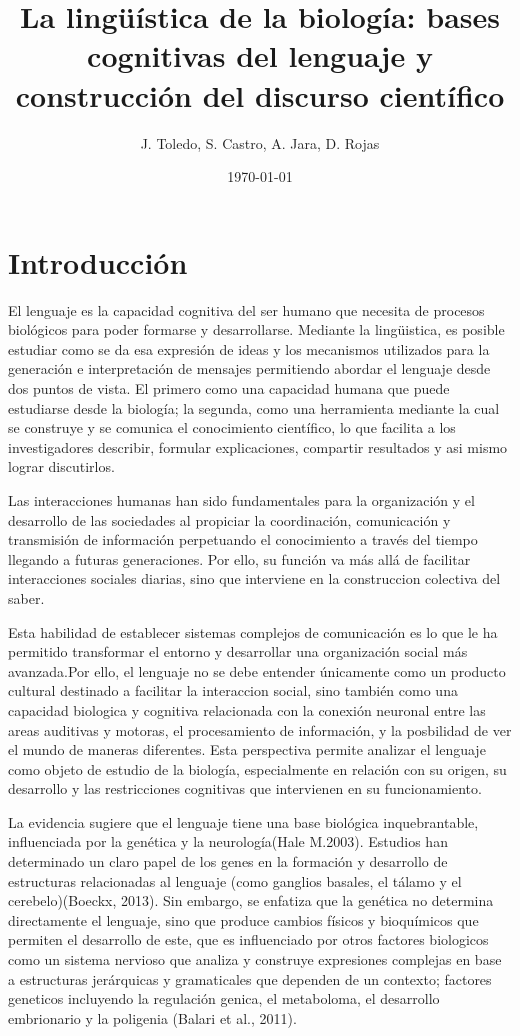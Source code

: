 \documentclass[12pt]{article}
\title{La lingüística de la biología: bases cognitivas del lenguaje y construcción del discurso científico}
\author{J. Toledo, S. Castro, A. Jara, D. Rojas}
\date{\today}
\begin{document}
\maketitle

\section{Introducción}
El lenguaje es la capacidad cognitiva del ser humano que necesita de procesos biológicos para poder formarse y desarrollarse. Mediante la lingüistica, es posible estudiar como se da esa expresión de ideas y los mecanismos utilizados para la generación e interpretación de mensajes permitiendo abordar el lenguaje desde dos puntos de vista. El primero como una capacidad humana que puede estudiarse desde la biología; la segunda, como una herramienta mediante la cual se construye y se comunica el conocimiento científico, lo que facilita a los investigadores describir, formular explicaciones, compartir resultados y asi mismo lograr discutirlos.

Las interacciones humanas han sido fundamentales para la organización y el desarrollo de las sociedades al propiciar la coordinación, comunicación y transmisión de información perpetuando el conocimiento a través del tiempo llegando a futuras generaciones. Por ello, su función va más allá de facilitar interacciones sociales diarias, sino que interviene en la construccion colectiva del saber. 

Esta habilidad de establecer sistemas complejos de comunicación es lo que le ha permitido transformar el entorno y desarrollar una organización social más avanzada.Por ello, el lenguaje no se debe entender únicamente como un producto cultural destinado a facilitar la interaccion social, sino también como una capacidad biologica y cognitiva relacionada con la conexión neuronal entre las areas auditivas y motoras, el procesamiento de información, y la posbilidad de ver el mundo de maneras diferentes. Esta perspectiva permite analizar el lenguaje como objeto de estudio de la biología, especialmente en relación con su origen, su desarrollo y las restricciones cognitivas que intervienen en su funcionamiento.

La evidencia sugiere que el lenguaje tiene una base biológica inquebrantable, influenciada por la genética y la neurología(Hale M.2003). Estudios han determinado un claro papel de los genes en la formación y desarrollo de estructuras relacionadas al lenguaje (como ganglios basales, el tálamo y el cerebelo)(Boeckx, 2013). Sin embargo, se enfatiza que la genética no determina directamente el lenguaje, sino que produce cambios físicos y bioquímicos que permiten el desarrollo de este, que es influenciado por otros factores biologicos como un sistema nervioso que analiza y construye expresiones complejas en base a estructuras jerárquicas y gramaticales que dependen de un contexto; factores geneticos incluyendo la regulación genica, el metaboloma, el desarrollo embrionario y la poligenia (Balari et al., 2011).
\end{document}
